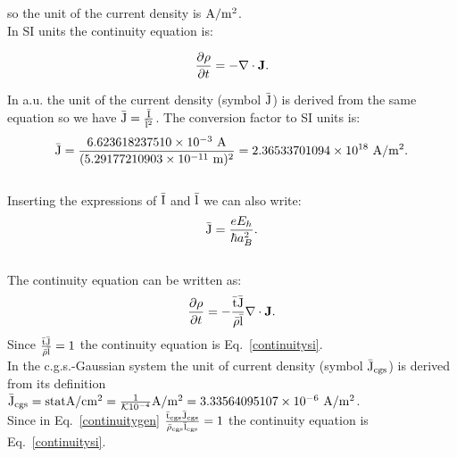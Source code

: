 \documentclass[12pt,a4paper,twoside]{report}
\def\barl{5.29177210903\times 10^{-11}}
\def\bari{6.623618237510\times 10^{-3}}
\def\barcur{2.36533701094\times 10^{18}}
\def\curtocur{3.33564095107\times 10^{-6}}
\begin{document}
{so the unit of the current density is ${\rm A}/{\rm m}^2$.
\\
In SI units the continuity equation is:

\begin{tcolorbox}
\begin{equation}
{\partial \rho \over \partial t}=-\nabla \cdot {\bf J}.
\label{continuitysi}
\end{equation}
\end{tcolorbox}

{\color{web-blue} In a.u. the unit of the current density (symbol ${\rm \bar J}$) 
is derived 
from the same equation so we have ${\rm \bar J} ={{\rm \bar I} \over {\rm \bar l}^2}$. The
conversion factor to SI units is: 
\begin{equation}
{\rm \bar J} = {\bari\ {\rm A}\over (\barl\ {\rm m})^2}=\barcur\ {\rm A}/{\rm m}^2. 
\end{equation}
\\
Inserting the expressions of ${\rm \bar I}$ and ${\rm \bar l}$ we can also write:
\begin{equation}
{\rm \bar J} = {e E_h \over \hbar a_B^2}. 
\end{equation}
\\
The continuity equation can be written as:
\begin{equation}
{\partial \rho \over \partial t}=-{{\rm \bar t \bar J} \over {\rm \bar \rho \bar l}} 
\nabla \cdot {\bf J}.
\label{continuitygen}
\end{equation}
Since ${{\rm \bar t \bar J} \over {\rm \bar \rho \bar l}}=1$ the continuity equation 
is Eq.~\ref{continuitysi}.
}
\\

{\color{orange} In the c.g.s.-Gaussian system the unit of current density  
(symbol ${\rm \bar J_{cgs}}$) is derived from its definition 
${\rm \bar J_{cgs}}={\rm statA}/{\rm cm}^2 = {1 \over \mathcal{K} 10^{-4}} {\rm A}/{\rm m}^2=\curtocur\ {\rm A}/{\rm m}^2$.
\\
Since in Eq.~\ref{continuitygen} ${{\rm \bar t_{cgs} \bar J_{cgs}} \over 
{\rm \bar \rho_{cgs} \bar l_{cgs}}}=1$ the continuity equation is 
Eq.~\ref{continuitysi}.
}
\\

}
\end{document}
